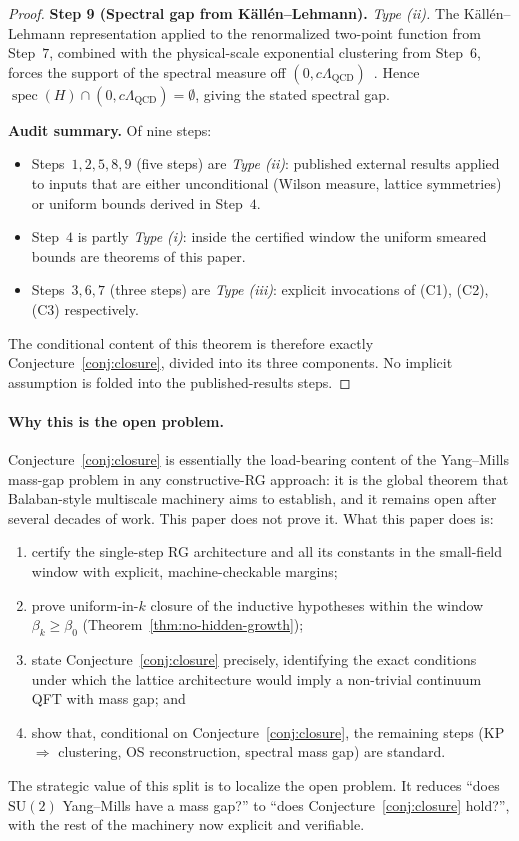 \documentclass[11pt]{article}
\theoremstyle{definition}
\newcommand{\SU}{\mathrm{SU}}
\newcommand{\Lam}{\Lambda_{\mathrm{QCD}}}
\begin{document}
\begin{proof}
\medskip\noindent\textbf{Step 9 (Spectral gap from K\"all\'en--Lehmann).}
\textit{Type \textup{(ii)}.}  The K\"all\'en--Lehmann representation
applied to the renormalized two-point function from Step~$7$, combined
with the physical-scale exponential clustering from Step~$6$,
forces the support of the spectral measure off
$(0, c\Lam)$~\cite{StreaterWightman}.  Hence
$\operatorname{spec}(H)\cap(0, c\Lam)=\emptyset$, giving the stated
spectral gap.

\medskip\noindent\textbf{Audit summary.}  Of nine steps:
\begin{itemize}[nosep]
\item Steps~$1, 2, 5, 8, 9$ \textup{(}five steps\textup{)} are
\textit{Type \textup{(ii)}}: published external results applied to
inputs that are either unconditional \textup{(}Wilson measure, lattice
symmetries\textup{)} or uniform bounds derived in Step~$4$.
\item Step~$4$ is partly \textit{Type \textup{(i)}}: inside the
certified window the uniform smeared bounds are theorems of this
paper.
\item Steps~$3, 6, 7$ \textup{(}three steps\textup{)} are
\textit{Type \textup{(iii)}}: explicit invocations of \textup{(C1)},
\textup{(C2)}, \textup{(C3)} respectively.
\end{itemize}
The conditional content of this theorem is therefore exactly
Conjecture~\ref{conj:closure}, divided into its three components.  No
implicit assumption is folded into the published-results steps.
\end{proof}

\paragraph{Why this is the open problem.}
Conjecture~\ref{conj:closure} is essentially the load-bearing
content of the Yang--Mills mass-gap problem in any
constructive-RG approach: it is the global theorem that
Balaban-style multiscale machinery aims to establish, and it
remains open after several decades of work.  This paper does not
prove it.  What this paper does is:
\begin{enumerate}[nosep]
\item certify the single-step RG architecture and all its
constants in the small-field window with explicit, machine-checkable
margins;
\item prove uniform-in-$k$ closure of the inductive hypotheses
within the window $\beta_k\ge\beta_0$ (Theorem~\ref{thm:no-hidden-growth});
\item state Conjecture~\ref{conj:closure} precisely, identifying
the exact conditions under which the lattice architecture would
imply a non-trivial continuum QFT with mass gap; and
\item show that, conditional on Conjecture~\ref{conj:closure}, the
remaining steps (KP $\Rightarrow$ clustering, OS reconstruction,
spectral mass gap) are standard.
\end{enumerate}
The strategic value of this split is to localize the open problem.
It reduces ``does $\SU(2)$ Yang--Mills have a mass gap?'' to
``does Conjecture~\ref{conj:closure} hold?'', with the rest of the
machinery now explicit and verifiable.
\end{document}
